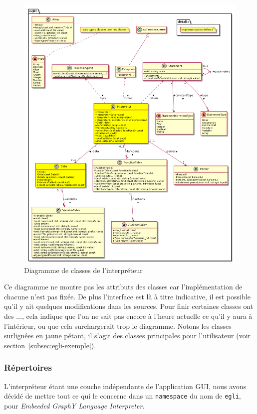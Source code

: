 \documentclass[french]{article}
\begin{document}
				\begin{figure}[H]
					\centering
					\includegraphics[width=\textwidth]{Conception/UMLEGLI}
					\caption{Diagramme de classes de l'interpréteur  \cite{plantuml}}
				\end{figure}
				
				Ce diagramme ne montre pas les attributs des classes car l'implémentation de chacune n'est pas fixée. De plus l'interface est là à titre indicative, il est possible qu'il y ait quelques modifications dans les sources. Pour finir certaines classes ont des $\dots$, cela indique que l'on ne sait pas encore à l'heure actuelle ce qu'il y aura à l'intérieur, ou que cela surchargerait trop le diagramme. Notons les classes surlignées en jaune pétant, il s'agit des classes principales pour l'utilisateur (voir section~\ref{subsec:egli-exemple}).  
			
			\subsubsection{Répertoires}
				L'interpréteur étant une couche indépendante de l'application GUI, nous avons décidé de mettre tout ce qui le concerne dans un \texttt{namespace} du nom de \texttt{egli}, pour \textit{Embeeded GraphY Language Interpreter}.\\
				
\end{document}

